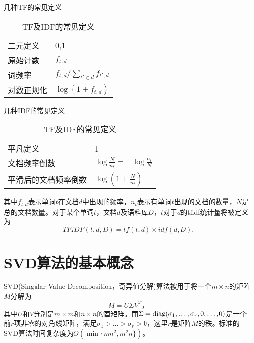 \begin{table}[H]
	\centering
	\begin{subtable}{0.45\textwidth}
		\centering
		\caption{几种TF的常见定义}
		\begin{tabular}{ll}
		二元定义 & 0,1\\
		原始计数 & $f_{t,d}$\\
		词频率 & $f_{t,d}/\sum_{t'\in d}f_{t',d}$\\
		对数正规化 & $\log(1+f_{t,d})$
		\end{tabular}
	\end{subtable}
	\begin{subtable}{0.45\textwidth}
		\centering
		\caption{几种IDF的常见定义}
		\begin{tabular}{ll}
		平凡定义 & 1\\
		文档频率倒数 & $\log\frac{N}{n_t}=-\log\frac{n_t}{N}$\\
		平滑后的文档频率倒数 & $\log\left(1+\frac{N}{n_t}\right)$
		\end{tabular}
	\end{subtable}
	\caption{TF及IDF的常见定义}
\end{table}
其中$f_{t,d}$表示单词$t$在文档$d$中出现的频率，$n_t$表示有单词$t$出现的文档的数量，$N$是总的文档数量。对于某个单词$t$，文档$d$及语料库$D$，$t$对于$d$的tfidf统计量将被定义为
\begin{equation}
TFIDF(t,d,D)=tf(t,d)\times idf(d,D).
\end{equation}

\section{SVD算法的基本概念}

SVD(Singular Value Decomposition，奇异值分解)算法被用于将一个$m\times n$的矩阵$M$分解为
\begin{equation}
M=U\Sigma V^T，
\end{equation}
其中$U$和$V$分别是$m\times m$和$n\times n$的酉矩阵。而$\Sigma=\textup{diag}(\sigma_1,\dots,\sigma_r,0,\dots,0)$是一个前$r$项非零的对角线矩阵，满足$\sigma_1>\dots>\sigma_r>0$，这里$r$是矩阵$M$的秩。标准的SVD算法时间复杂度为$O(\min\{mn^2,m^2n\})$。

